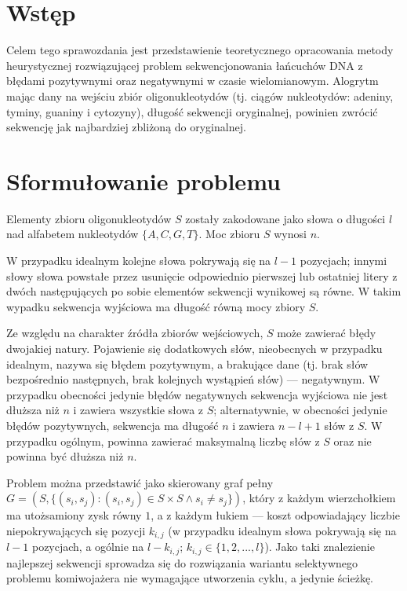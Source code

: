 \documentclass{article}
\begin{document}



\section{Wstęp}
Celem tego sprawozdania jest przedstawienie teoretycznego opracowania metody heurystycznej rozwiązującej problem sekwencjonowania łańcuchów DNA z błędami pozytywnymi oraz negatywnymi w czasie wielomianowym. Alogrytm mając dany na wejściu zbiór oligonukleotydów (tj. ciągów nukleotydów: adeniny, tyminy, guaniny i cytozyny), długość sekwencji oryginalnej, powinien zwrócić sekwencję jak najbardziej zbliżoną do oryginalnej.

\section{Sformułowanie problemu}
Elementy zbioru oligonukleotydów $S$ zostały zakodowane jako słowa o długości $l$ nad alfabetem nukleotydów $\{A, C, G, T\}$.
Moc zbioru $S$ wynosi $n$.

W przypadku idealnym kolejne słowa pokrywają się na $l-1$ pozycjach; innymi słowy słowa powstałe przez usunięcie odpowiednio pierwszej lub ostatniej litery z dwóch następujących po sobie elementów sekwencji wynikowej są równe.
W takim wypadku sekwencja wyjściowa ma długość równą mocy zbiory $S$.

Ze względu na charakter źródła zbiorów wejściowych, $S$ może zawierać błędy dwojakiej natury.
Pojawienie się dodatkowych słów, nieobecnych w przypadku idealnym, nazywa się błędem pozytywnym, a brakujące dane (tj. brak słów bezpośrednio następnych, brak kolejnych wystąpień słów) --- negatywnym.
W przypadku obecności jedynie błędów negatywnych sekwencja wyjściowa nie jest dłuższa niż $n$ i zawiera wszystkie słowa z $S$; alternatywnie, w obecności jedynie błędów pozytywnych, sekwencja ma długość $n$ i zawiera $n-l+1$ słów z $S$.
W przypadku ogólnym, powinna zawierać maksymalną liczbę słów z $S$ oraz nie powinna być dłuższa niż $n$.

Problem można przedstawić jako skierowany graf pełny $G=(S,\lbrace(s_i,s_j):(s_i,s_j)\in S\times S \land s_i\neq s_j\rbrace)$, który z każdym wierzchołkiem ma utożsamiony  zysk równy $1$, a z każdym łukiem --- koszt odpowiadający liczbie niepokrywających się pozycji $k_{i,j}$ (w przypadku idealnym słowa pokrywają się na $l-1$ pozycjach, a ogólnie na $l-k_{i,j}$; $k_{i,j}\in\lbrace1,2,...,l\rbrace$).
Jako taki znalezienie najlepszej sekwencji sprowadza się do rozwiązania wariantu selektywnego problemu komiwojażera nie wymagające utworzenia cyklu, a jedynie ścieżkę.
\end{document}

